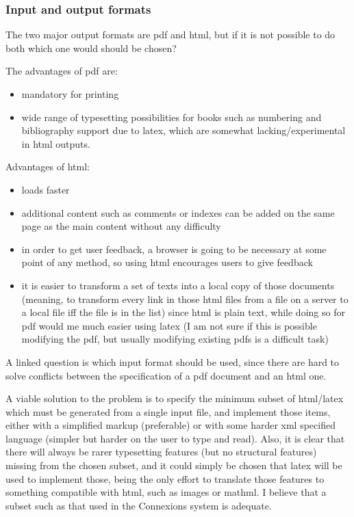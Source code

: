 \documentclass[12pt]{article}
\begin{document}
  \subsubsection{Input and output formats}
  
  The two major output formats are pdf and html, but if it is not possible to do both which one would should be chosen?
  
  The advantages of pdf are:
  
  \begin{itemize}
    \item mandatory for printing
    \item wide range of typesetting possibilities for books such as numbering and bibliography support due to latex, which are somewhat lacking/experimental in html outputs.
  \end{itemize}
  
  Advantages of html:
  
  \begin{itemize}
    \item loads faster
    \item additional content such as comments or indexes can be added on the same page as the main content without any difficulty
    \item in order to get user feedback, a browser is going to be necessary at some point of any method, so using html encourages users to give feedback
    \item it is easier to transform a set of texts into a local copy of those documents (meaning, to transform every link in those html files from a file on a server to a local file iff the file is in the list) since html is plain text, while doing so for pdf  would me much easier using latex (I am not sure if this is possible modifying the pdf, but usually modifying existing pdfs is a difficult task)
  \end{itemize}

  A linked question is which input format should be used, since there are hard to solve conflicts between the specification of a pdf document and an html one.
  
  A viable solution to the problem is to specify the minimum subset of html/latex which must be generated from a single input file, and implement those items, either with a simplified markup (preferable) or with some harder xml specified language (simpler but harder on the user to type and read). Also, it is clear that there will always be rarer typesetting features (but no structural features) missing from the chosen subset, and it could simply be chosen that latex will be used to implement those, being the only effort to translate those features to something compatible with html, such as images or mathml. I believe that a subset such as that used in the Connexions system is adequate.
\end{document}
